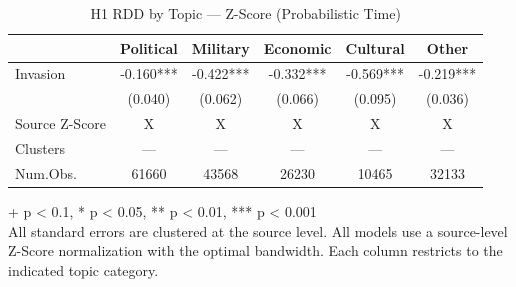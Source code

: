 \begin{table}[t]
\caption{\label{tab:table-s02}H1 RDD by Topic — Z-Score (Probabilistic Time)}
\fontsize{12.0pt}{14.0pt}\selectfont
\begin{tabular*}{\linewidth}{@{\extracolsep{\fill}}lccccc}
\toprule
  & Political & Military & Economic & Cultural & Other \\ 
\midrule\addlinespace[2.5pt]
Invasion & -0.160*** & -0.422*** & -0.332*** & -0.569*** & -0.219*** \\ 
{} & {(0.040)} & {(0.062)} & {(0.066)} & {(0.095)} & {(0.036)} \\ 
Source Z-Score & X & X & X & X & X \\ 
Clusters & — & — & — & — & — \\ 
Num.Obs. & 61660 & 43568 & 26230 & 10465 & 32133 \\ 
\bottomrule
\end{tabular*}
\begin{minipage}{\linewidth}
\vspace{.05em}
+ p < 0.1, * p < 0.05, ** p < 0.01, *** p < 0.001\\
All standard errors are clustered at the source level. All models use a
source-level Z-Score normalization with the optimal bandwidth. Each column
restricts to the indicated topic category.\\
\end{minipage}
\end{table}

